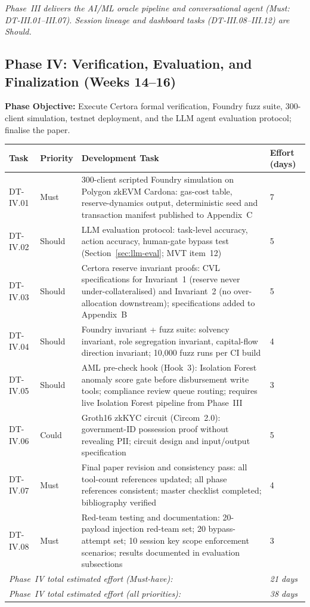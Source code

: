 \documentclass[12pt,a4paper]{report}
\newcommand{\tableheadcolor}{\rowcolor{TableHeadBg}}
\begin{document}
\vspace{2pt}
\noindent\textit{\small Phase~III delivers the AI/ML oracle pipeline and conversational agent (Must: DT-III.01--III.07). Session lineage and dashboard tasks (DT-III.08--III.12) are Should.}

\subsection{Phase IV: Verification, Evaluation, and Finalization (Weeks 14--16)}

\textbf{Phase Objective:} Execute Certora formal verification, Foundry fuzz suite,
300-client simulation, testnet deployment, and the LLM agent evaluation protocol; finalise the paper.

\begin{table}[H]
\centering
\begin{tabular}{p{1.8cm}p{1.8cm}p{7.5cm}p{1.5cm}}
\toprule
\tableheadcolor
\textbf{Task} & \textbf{Priority} & \textbf{Development Task} & \textbf{Effort (days)} \\
\midrule
DT-IV.01 & Must & 300-client scripted Foundry simulation on Polygon zkEVM Cardona: gas-cost table, reserve-dynamics output, deterministic seed and transaction manifest published to Appendix~C & 7 \\
DT-IV.02 & Should & LLM evaluation protocol: task-level accuracy, action accuracy, human-gate bypass test (Section~\ref{sec:llm-eval}; MVT item~12) & 5 \\
DT-IV.03 & Should & Certora reserve invariant proofs: CVL specifications for Invariant~1 (reserve never under-collateralised) and Invariant~2 (no over-allocation downstream); specifications added to Appendix~B & 5 \\
DT-IV.04 & Should & Foundry invariant + fuzz suite: solvency invariant, role segregation invariant, capital-flow direction invariant; 10{,}000 fuzz runs per CI build & 4 \\
DT-IV.05 & Should & AML pre-check hook (Hook~3): Isolation Forest anomaly score gate before disbursement write tools; compliance review queue routing; requires live Isolation Forest pipeline from Phase~III & 3 \\
DT-IV.06 & Could & Groth16 zkKYC circuit (Circom~2.0): government-ID possession proof without revealing PII; circuit design and input/output specification & 5 \\
DT-IV.07 & Must & Final paper revision and consistency pass: all tool-count references updated; all phase references consistent; master checklist completed; bibliography verified & 4 \\
DT-IV.08 & Must & Red-team testing and documentation: 20-payload injection red-team set; 20 bypass-attempt set; 10 session key scope enforcement scenarios; results documented in evaluation subsections & 3 \\
\multicolumn{3}{l}{\textit{Phase~IV total estimated effort (Must-have):}} & \textit{21 days} \\
\multicolumn{3}{l}{\textit{Phase~IV total estimated effort (all priorities):}} & \textit{38 days} \\
\bottomrule
\end{tabular}
\end{table}
\end{document}
